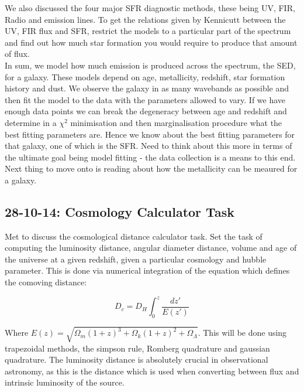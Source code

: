 \documentclass{literature}
\begin{document}
We also discussed the four major SFR diagnostic methods, these being UV, FIR, Radio and emission lines. To get the relations given by Kennicutt between the UV, FIR flux and SFR, restrict the models to a particular part of the spectrum and find out how much star formation you would require to produce that amount of flux. \\
In sum, we model how much emission is produced across the spectrum, the SED, for a galaxy. These models depend on age, metallicity, redshift, star formation history and dust. We observe the galaxy in as many wavebands as possible and then fit the model to the data with the parameters allowed to vary. If we have enough data points we can break the degeneracy between age and redshift and determine in a $\chi ^{2}$ minimisation and then marginalisation procedure what the best fitting parameters are. Hence we know about the best fitting parameters for that galaxy, one of which is the SFR. Need to think about this more in terms of the ultimate goal being model fitting - the data collection is a means to this end. Next thing to move onto is reading about how the metallicity can be meaured for a galaxy. 
\subsection{28-10-14: Cosmology Calculator Task}\label{meeting_2}
Met to discuss the cosmological distance calculator task. Set the task of computing the luminosity distance, angular diameter distance, volume and age of the universe at a given redshift, given a particular cosmology and hubble parameter. This is done via numerical integration of the equation which defines the comoving distance: 

\begin{equation}
D_{c} = D_{H} \int ^{z} _{0}\frac{dz\prime}{E(z\prime)} 
\end{equation}

Where $E(z) = \sqrt{\Omega _{m}(1 + z)^{3} + \Omega _{k}(1 + z)^{2} + \Omega _{\Lambda}}$. This will be done using trapezoidal methods, the simpson rule, Romberg quadrature and gaussian quadrature. The luminosity distance is absolutely crucial in observational astronomy, as this is the distance which is used when converting between flux and intrinsic luminosity of the source.
\end{document}

